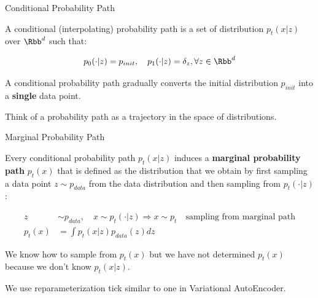 \documentclass[aspectratio=169,xcolor=dvipsnames,svgnames,x11names,fleqn]{beamer}
\begin{document}
\begin{frame}{Conditional Probability Path}

    A conditional (interpolating) probability path is a set of distribution $p_t(x|z)$ over $\Rbb^d$ such that:

    $$
    p_0(\cdot | z) = p_{init}, \quad p_1(\cdot | z) = \delta_z, \forall z \in \Rbb^d
    $$

    A conditional probability path gradually converts the initial distribution $p_{init}$ into a \textbf{single} data point.

    \begin{tcolorbox}[enhanced, sharp corners, boxrule=0.0pt, leftrule = 0.2em, toprule = 0.2em, colframe=white!80!neonBlue, colback=frameNavy!20,
    notitle, left=1mm ]
Think of a probability path as a trajectory in the space of distributions.
    \end{tcolorbox}
    
\end{frame}

\begin{frame}{Marginal Probability Path}

        \begin{tcolorbox}[enhanced, sharp corners, boxrule=0.0pt, leftrule = 0.2em, toprule = 0.2em, colframe=white!80!springGreen, colback=hunterGreen!20,
    notitle, left=1mm ]
            Every conditional probability path $p_t(x|z)$ induces a \textbf{marginal probability path} $p_t(x)$ that is defined as the distribution that we obtain by first sampling a data point $ z\sim p_{data}$ from the data distribution and then sampling from $p_t(\cdot | z)$:

            \begin{align*}
            z & \sim p_{data}, \quad x \sim p_t(\cdot | z) \Rightarrow x \sim p_t \quad \text{sampling from marginal path} \\
            p_t(x)  & = \int p_t(x|z) p_{data}(z) dz
            \end{align*}

            We know how to sample from $p_t(x)$ but  we have not determined $p_t(x)$ because we don't know $p_t(x|z)$.

    \end{tcolorbox}

    We use reparameterization tick similar to one in Variational AutoEncoder.
    
\end{frame}
\end{document}

